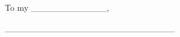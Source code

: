 \begin{dedication} \null\vfil 
\begin{center}
{\large{}To my \_\_\_\_\_\_\_\_\_\_\_\_,}\\
{\large{}\vspace{12pt}
}{\large\par}
\par\end{center}

\begin{center}
{\large{}\_\_\_\_\_\_\_\_\_\_\_\_\_\_\_\_\_\_\_\_\_\_\_\_\_\_\_}{\large\par}
\par\end{center}

\vfil\null \end{dedication}
